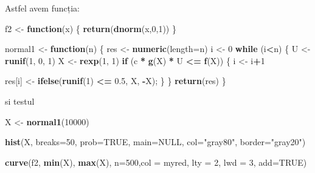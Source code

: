\documentclass[]{article}
\newenvironment{Shaded}{\begin{snugshade}}{\end{snugshade}}
\newcommand{\KeywordTok}[1]{\textcolor[rgb]{0.13,0.29,0.53}{\textbf{#1}}}
\newcommand{\DataTypeTok}[1]{\textcolor[rgb]{0.13,0.29,0.53}{#1}}
\newcommand{\DecValTok}[1]{\textcolor[rgb]{0.00,0.00,0.81}{#1}}
\newcommand{\FloatTok}[1]{\textcolor[rgb]{0.00,0.00,0.81}{#1}}
\newcommand{\StringTok}[1]{\textcolor[rgb]{0.31,0.60,0.02}{#1}}
\newcommand{\OtherTok}[1]{\textcolor[rgb]{0.56,0.35,0.01}{#1}}
\newcommand{\ControlFlowTok}[1]{\textcolor[rgb]{0.13,0.29,0.53}{\textbf{#1}}}
\newcommand{\OperatorTok}[1]{\textcolor[rgb]{0.81,0.36,0.00}{\textbf{#1}}}
\newcommand{\NormalTok}[1]{#1}
\begin{document}
Astfel avem funcția:

\begin{Shaded}
\begin{Highlighting}[]
\NormalTok{f2 <-}\StringTok{ }\ControlFlowTok{function}\NormalTok{(x) \{}
  \KeywordTok{return}\NormalTok{(}\KeywordTok{dnorm}\NormalTok{(x,}\DecValTok{0}\NormalTok{,}\DecValTok{1}\NormalTok{))}
\NormalTok{\}}

\NormalTok{normal1 <-}\StringTok{ }\ControlFlowTok{function}\NormalTok{(n) \{}
\NormalTok{  res <-}\StringTok{ }\KeywordTok{numeric}\NormalTok{(}\DataTypeTok{length=}\NormalTok{n)}
\NormalTok{  i <-}\StringTok{ }\DecValTok{0}
  \ControlFlowTok{while}\NormalTok{ (i}\OperatorTok{<}\NormalTok{n) \{}
\NormalTok{    U <-}\StringTok{ }\KeywordTok{runif}\NormalTok{(}\DecValTok{1}\NormalTok{, }\DecValTok{0}\NormalTok{, }\DecValTok{1}\NormalTok{)}
\NormalTok{    X <-}\StringTok{ }\KeywordTok{rexp}\NormalTok{(}\DecValTok{1}\NormalTok{, }\DecValTok{1}\NormalTok{)}
    \ControlFlowTok{if}\NormalTok{ (c }\OperatorTok{*}\StringTok{ }\KeywordTok{g}\NormalTok{(X) }\OperatorTok{*}\StringTok{ }\NormalTok{U }\OperatorTok{<=}\StringTok{ }\KeywordTok{f}\NormalTok{(X)) \{}
\NormalTok{      i <-}\StringTok{ }\NormalTok{i}\OperatorTok{+}\DecValTok{1}
      
\NormalTok{      res[i] <-}\StringTok{ }\KeywordTok{ifelse}\NormalTok{(}\KeywordTok{runif}\NormalTok{(}\DecValTok{1}\NormalTok{) }\OperatorTok{<=}\StringTok{ }\FloatTok{0.5}\NormalTok{, X, }\OperatorTok{-}\NormalTok{X);}
\NormalTok{    \}}
\NormalTok{  \}}
  \KeywordTok{return}\NormalTok{(res)}
\NormalTok{\}}
\end{Highlighting}
\end{Shaded}

si testul

\begin{Shaded}
\begin{Highlighting}[]
\NormalTok{X <-}\StringTok{ }\KeywordTok{normal1}\NormalTok{(}\DecValTok{10000}\NormalTok{)}

\KeywordTok{hist}\NormalTok{(X, }\DataTypeTok{breaks=}\DecValTok{50}\NormalTok{, }
     \DataTypeTok{prob=}\OtherTok{TRUE}\NormalTok{, }
     \DataTypeTok{main=}\OtherTok{NULL}\NormalTok{, }
     \DataTypeTok{col=}\StringTok{"gray80"}\NormalTok{, }\DataTypeTok{border=}\StringTok{"gray20"}\NormalTok{)}

\KeywordTok{curve}\NormalTok{(f2, }\KeywordTok{min}\NormalTok{(X), }\KeywordTok{max}\NormalTok{(X), }\DataTypeTok{n=}\DecValTok{500}\NormalTok{,}\DataTypeTok{col =}\NormalTok{ myred, }\DataTypeTok{lty =} \DecValTok{2}\NormalTok{, }\DataTypeTok{lwd =} \DecValTok{3}\NormalTok{, }\DataTypeTok{add=}\OtherTok{TRUE}\NormalTok{)}
\end{Highlighting}
\end{Shaded}
\end{document}
